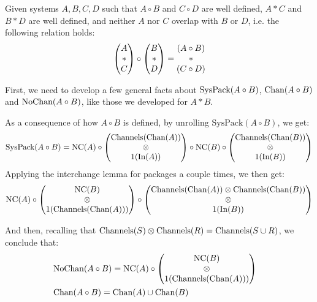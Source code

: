 \begin{lemma}
Given systems $A, B, C, D$ such that $A \circ B$ and $C \circ D$ are well defined,
$A * C$ and $B * D$ are well defined,
and neither $A$ nor $C$ overlap with $B$ or $D$, i.e.
the following relation holds:
$$
\begin{pmatrix} 
A\cr
*\cr
C\cr
\end{pmatrix} 
\circ
\begin{pmatrix} 
B\cr
*\cr
D\cr
\end{pmatrix} 
=
\begin{matrix} 
  (A \circ B)\cr
*\cr
  (C \circ D)\cr
\end{matrix} 
$$

First, we need to develop a few general facts about $\text{SysPack}(A \circ B)$, $\text{Chan}(A \circ B)$
and $\text{NoChan}(A \circ B)$, like those we developed for $A * B$.

As a consequence of how $A \circ B$ is defined, by unrolling $\text{SysPack}(A \circ B)$,
we get:
$$
  \text{SysPack}(A \circ B) =
  \text{NC}(A) \circ
  \begin{pmatrix}
    \text{Channels}(\text{Chan}(A))\cr
    \otimes\cr
    1(\text{In}(A))
  \end{pmatrix}
  \circ \text{NC}(B) \circ
  \begin{pmatrix}
    \text{Channels}(\text{Chan}(B))\cr
    \otimes\cr
    1(\text{In}(B))
  \end{pmatrix}
$$
Applying the interchange lemma for packages a couple times, we then get:
$$
  \text{NC}(A) \circ
  \begin{pmatrix}
    \text{NC}(B)\cr
    \otimes\cr
    1(\text{Channels}(\text{Chan}(A)))
  \end{pmatrix}
  \circ
  \begin{pmatrix}
    \text{Channels}(\text{Chan}(A)) \otimes \text{Channels}(\text{Chan}(B))\cr
    \otimes\cr
    1(\text{In}(B))
  \end{pmatrix}
$$

And then, recalling
that $\text{Channels}(S) \otimes \text{Channels}(R) = \text{Channels}(S \cup R)$,
we conclude that:
$$
\begin{aligned}
  &\text{NoChan}(A \circ B) =
  \text{NC}(A) \circ
  \begin{pmatrix}
    \text{NC}(B)\cr
    \otimes\cr
    1(\text{Channels}(\text{Chan}(A)))
  \end{pmatrix}
  \cr
  &\text{Chan}(A \circ B) = \text{Chan}(A) \cup \text{Chan}(B)\cr
\end{aligned}
$$


\end{lemma}
